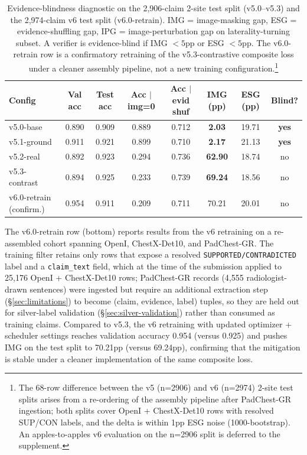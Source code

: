 \documentclass[pmlr]{jmlr}
\begin{document}
\begin{table}[t]
\centering
\small
\caption{Evidence-blindness diagnostic on the 2{,}906-claim 2-site test split (v5.0--v5.3) and the 2{,}974-claim v6 test split (v6.0-retrain). IMG = image-masking gap, ESG = evidence-shuffling gap, IPG = image-perturbation gap on laterality-turning subset. A verifier is evidence-blind if IMG $<5$pp or ESG $<5$pp. The v6.0-retrain row is a confirmatory retraining of the v5.3-contrastive composite loss under a cleaner assembly pipeline, not a new training configuration.\protect\footnote{The 68-row difference between the v5 (n=2906) and v6 (n=2974) 2-site test splits arises from a re-ordering of the assembly pipeline after PadChest-GR ingestion; both splits cover OpenI + ChestX-Det10 rows with resolved SUP/CON labels, and the delta is within 1pp ESG noise (1000-bootstrap). An apples-to-apples v6 evaluation on the n=2906 split is deferred to the supplement.}}
\label{tab:headline}
\begin{tabular}{lccccccc}
\toprule
\textbf{Config} & \textbf{Val acc} & \textbf{Test acc} & \textbf{Acc $|$ img=0} & \textbf{Acc $|$ evid shuf} & \textbf{IMG (pp)} & \textbf{ESG (pp)} & \textbf{Blind?} \\
\midrule
v5.0-base       & 0.890 & 0.909 & 0.889 & 0.712 & \textbf{2.03}  & 19.71 & \textbf{yes} \\
v5.1-ground     & 0.911 & 0.921 & 0.899 & 0.710 & \textbf{2.17}  & 21.13 & \textbf{yes} \\
v5.2-real       & 0.892 & 0.923 & 0.294 & 0.736 & \textbf{62.90} & 18.74 & no \\
v5.3-contrast   & 0.894 & 0.925 & 0.233 & 0.739 & \textbf{69.24} & 18.56 & no \\
\addlinespace
v6.0-retrain (confirm.) & 0.954 & 0.911 & 0.209 & 0.711 & 70.21 & 20.01 & no \\
\bottomrule
\end{tabular}
\end{table}

The v6.0-retrain row (bottom) reports results from the v6 retraining on a re-assembled cohort spanning OpenI, ChestX-Det10, and PadChest-GR. The training filter retains only rows that expose a resolved \texttt{SUPPORTED/CONTRADICTED} label and a \texttt{claim\_text} field, which at the time of the submission applied to 25{,}176 OpenI + ChestX-Det10 rows; PadChest-GR records (4{,}555 radiologist-drawn sentences) were ingested but require an additional extraction step (§\ref{sec:limitations}) to become (claim, evidence, label) tuples, so they are held out for silver-label validation (§\ref{sec:silver-validation}) rather than consumed as training claims. Compared to v5.3, the v6 retraining with updated optimizer + scheduler settings reaches validation accuracy 0.954 (versus 0.925) and pushes IMG on the test split to 70.21pp (versus 69.24pp), confirming that the mitigation is stable under a cleaner implementation of the same composite loss.
\end{document}
